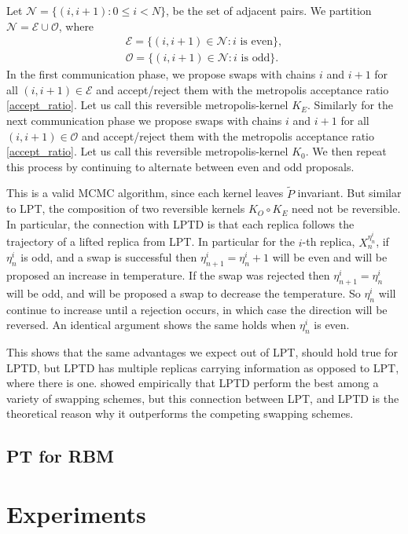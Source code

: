 \documentclass[12pt]{article}
\begin{document}
Let $\mathcal{N}=\{(i,i+1):0\leq i<N\}$, be the set of adjacent pairs. We partition $\mathcal{N}=\mathcal{E}\cup\mathcal{O}$, where
\begin{align*}
\mathcal{E}=\{(i,i+1)\in \mathcal{N}: i \text{ is even}\},\\
\mathcal{O}=\{(i,i+1)\in \mathcal{N}: i \text{ is odd}\}.
\end{align*}
In the first communication phase, we propose swaps with chains $i$ and $i+1$ for all $(i,i+1)\in\mathcal{E}$ and accept/reject them with the metropolis acceptance ratio \eqref{accept_ratio}. Let us call this reversible metropolis-kernel $K_E$. Similarly for the next communication phase we propose swaps with chains $i$ and $i+1$ for all $(i,i+1)\in\mathcal{O}$ and accept/reject them with the metropolis acceptance ratio \eqref{accept_ratio}. Let us call this reversible metropolis-kernel $K_0$. We then repeat this process by continuing to alternate between even and odd proposals. 

This is a valid MCMC algorithm, since each kernel leaves $\tilde{P}$ invariant. But similar to LPT, the composition of two reversible kernels $K_O\circ K_E$ need not be reversible. In particular, the connection with LPTD is that each replica follows the trajectory of a lifted replica from LPT. In particular for the $i$-th replica, $X_n^{\eta^i_n}$, if $\eta_n^i$ is odd, and a swap is successful then $\eta^i_{n+1}=\eta_n^i+1$ will be even and will be proposed an increase in temperature. If the swap was rejected then $\eta_{n+1}^i=\eta_n^i$ will be odd, and will be proposed a swap to decrease the temperature. So $\eta_n^i$ will continue to increase until a rejection occurs, in which case the direction will be reversed. An identical argument shows the same holds when $\eta_n^i$ is even. 

This shows that the same advantages we expect out of LPT, should hold true for LPTD, but LPTD has multiple replicas carrying information as opposed to LPT, where there is one. \cite{lingenheil2009efficiency} showed empirically that LPTD perform the best among a variety of swapping schemes, but this connection between LPT, and LPTD is the theoretical reason why it outperforms the competing swapping schemes. 
\subsection{PT for RBM}
\section{Experiments}

 

\end{document}
